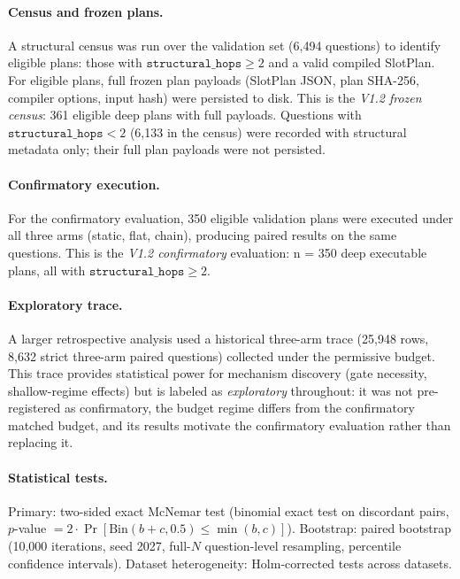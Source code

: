 \paragraph{Census and frozen plans.}
A structural census was run over the validation set (6,494 questions) to identify eligible plans: those with $\texttt{structural\_hops} \geq 2$ and a valid compiled SlotPlan. For eligible plans, full frozen plan payloads (SlotPlan JSON, plan SHA-256, compiler options, input hash) were persisted to disk. This is the \emph{V1.2 frozen census}: 361 eligible deep plans with full payloads. Questions with $\texttt{structural\_hops} < 2$ (6,133 in the census) were recorded with structural metadata only; their full plan payloads were not persisted.

\paragraph{Confirmatory execution.}
For the confirmatory evaluation, 350 eligible validation plans were executed under all three arms (static, flat, chain), producing paired results on the same questions. This is the \emph{V1.2 confirmatory} evaluation: n = 350 deep executable plans, all with $\texttt{structural\_hops} \geq 2$.

\paragraph{Exploratory trace.}
A larger retrospective analysis used a historical three-arm trace (25,948 rows, 8,632 strict three-arm paired questions) collected under the permissive budget. This trace provides statistical power for mechanism discovery (gate necessity, shallow-regime effects) but is labeled as \emph{exploratory} throughout: it was not pre-registered as confirmatory, the budget regime differs from the confirmatory matched budget, and its results motivate the confirmatory evaluation rather than replacing it.

\paragraph{Statistical tests.}
Primary: two-sided exact McNemar test (binomial exact test on discordant pairs, $p$-value $= 2 \cdot \Pr[\text{Bin}(b+c, 0.5) \leq \min(b,c)]$). Bootstrap: paired bootstrap (10,000 iterations, seed 2027, full-$N$ question-level resampling, percentile confidence intervals). Dataset heterogeneity: Holm-corrected tests across datasets.
